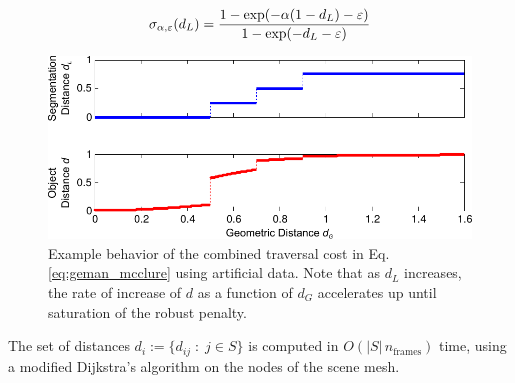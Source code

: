 % 

\begin{equation}\label{eq:shaping}
\sigma_{\alpha,\varepsilon}(d_L) = \frac{1-\exp(-\alpha(1-d_L)-\varepsilon)}{1-\exp(-d_L-\varepsilon)}
\end{equation}
\begin{figure}
    \centering
    \includegraphics[width=0.95\linewidth]{figs/saturating_distances}
    \caption{\small Example behavior of the combined traversal cost in Eq. \ref{eq:geman_mcclure} using artificial data.
    Note that as $d_L$ increases, the rate of increase of $d$ as a function of $d_G$ accelerates up until saturation of the robust penalty.}
\label{fig:shapingFn}

\end{figure}


The set of distances $d_i := \{d_{ij}\;:\;j\in S\}$ is computed in $O(|S|\,n_{\text{frames}})$ time,
using a modified Dijkstra's algorithm on the nodes of the scene mesh.

